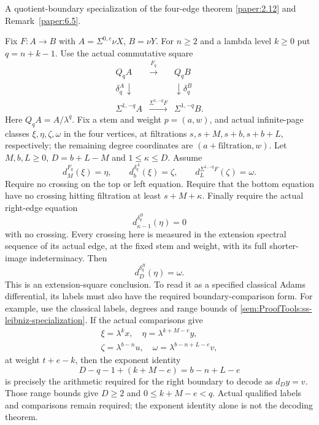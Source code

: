 \begin{proposition}
\label{sem:ProofTools:ss-cutoff-square-specialization}
A quotient-boundary specialization of the four-edge theorem
\ref{paper:2.12} and Remark~\ref{paper:6.5}.

Fix $F:A\to B$ with $A=\Sigma^{0,e}\nu X$, $B=\nu Y$. For
$n\ge2$ and a lambda level $k\ge0$ put $q=n+k-1$. Use the actual
commutative square
\[
\begin{array}{ccc}
Q_qA&\xrightarrow{F_q}&Q_qB\\
\delta_q^A\downarrow&&\downarrow\delta_q^B\\
\Sigma^{1,-q}A&\xrightarrow{\Sigma^{1,-q}F}&\Sigma^{1,-q}B.
\end{array}
\]
Here $Q_qA=A/\lambda^q$. Fix a stem and weight $p=(a,w)$, and actual
infinite-page classes $\xi,\eta,\zeta,\omega$ in the four vertices,
at filtrations $s,s+M,s+b,s+b+L$, respectively; the remaining degree
coordinates are $(a+\mathrm{filtration},w)$.
Let $M,b,L\ge0$, $D=b+L-M$ and $1\le\kappa\le D$.
Assume
\[
d_M^{F_q}(\xi)=\eta,\qquad
d_b^{\delta_q^A}(\xi)=\zeta,\qquad
d_L^{\Sigma^{1,-q}F}(\zeta)=\omega.
\]
Require no crossing on the top or left equation. Require that the
bottom equation have no crossing hitting filtration at least
$s+M+\kappa$. Finally require the actual right-edge equation
\[
d_{\kappa-1}^{\delta_q^B}(\eta)=0
\]
with no crossing. Every crossing here is measured in the extension
spectral sequence of its actual edge, at the fixed stem and weight,
with its full shorter-image indeterminacy. Then
\[
d_D^{\delta_q^B}(\eta)=\omega.
\]
This is an extension-square conclusion. To read it as a specified
classical Adams differential, its labels must also have the required
boundary-comparison form. For example, use the classical labels,
degrees and range bounds of \ref{sem:ProofTools:ss-leibniz-specialization}.
If the actual comparisons give
\[
\begin{gathered}
\xi=\lambda^k x,\quad
\eta=\lambda^{k+M-e}y,\\
\zeta=\lambda^{b-n}u,\quad
\omega=\lambda^{b-n+L-e}v,
\end{gathered}
\]
at weight $t+e-k$, then the exponent identity
\[
D-q-1+(k+M-e)=b-n+L-e
\]
is precisely the arithmetic required for the right boundary to decode
as $d_Dy=v$. Those range bounds give $D\ge2$ and
$0\le k+M-e<q$. Actual qualified labels and comparisons remain
required; the exponent identity alone is not the decoding theorem.
\end{proposition}
